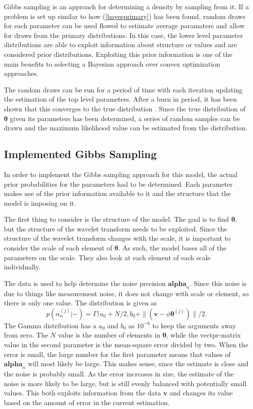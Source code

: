 \documentclass{IEEEtran}
\begin{document}
Gibbs sampling is an approach for determining a density by sampling
from it.  If a problem is set up similar to how (\ref{bayesprimary})
has been found, random draws for each parameter can be used
flowed to estimate average paramaters and allow for draws from the primary distributions.  In this
case, the lower level parameter distributions are able to exploit information
about structure or values and are considered prior distributions.
Exploiting this prior information is one of the main benefits to selecting a Bayesian approach over
convex optimization approaches.  

The random draws can be run for a period of time with each iteration
updating the estimation of the top level parameters. After a burn in
period, it has been shown that this
converges to the true distribution \cite{Mackay03}.  Since the true
distribution of $\mathbf{\theta}$ given its parameters has been determined, a series of random samples can be drawn
and the maximum likelihood value can be estimated from the
distribution.

\subsection{Implemented Gibbs Sampling}

In order to implement the Gibbs sampling approach for this model, the
actual prior probabilities for the parameters had to be
determined. Each parameter makes use of the prior information
available to it and the structure that the model is imposing on it.

The first thing to consider is the structure of the model.  The
goal is to find $\mathbf{\theta}$, but the structure of the wavelet
transform needs to be exploited.  Since the structure of the wavelet
transform changes with the scale, it is important to consider the
scale of each element of $\mathbf{\theta}$.  As such, the model bases
all of the parameters on the scale.  They also look at each element of
each scale individually.  

The data is used to help determine the noise precision
$\mathbf{alpha}_n$.  Since this noise is due to things like
measurement noise, it does not change with scale or element, so there
is only one value.  The distribution is given as 
\begin{equation}
 p(\alpha_n^{(j)}|-) =
    \Gamma(a_0+N/2,b_0+\|(\mathbf{v}-\phi\mathbf{\theta}^{(j)})\|/2 .
\label{alphan}
\end{equation}
The Gamma distribution has a $a_0$ and $b_0$ as $10^{-6}$ to keep the
arguments away from zero.  The $N$ value is the number of elements in
$\mathbf{\theta}$, while the vectpr-matrix value in the second
parameter is the mean-square error divided by two.  When the error is
small, the large number for the first parameter means that values of
$\mathbf{alpha}_n$ will most likely be large.  This makes sense, since
the estimate is close and the noise is probably small.  As the error
increases in size, the estimate of the noise is more likely to be
large, but is still evenly balanced with potentially small values.
This both exploits information from the data $\mathbf{v}$ and changes
its value based on the amount of error in the current estimation.
\end{document}
